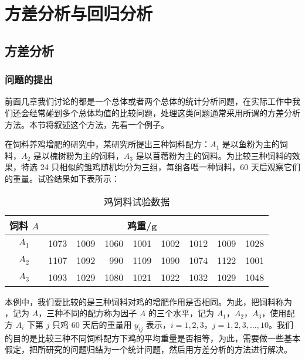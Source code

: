 \chapter{方差分析与回归分析}

\section{方差分析}
\subsection{问题的提出}
前面几章我们讨论的都是一个总体或者两个总体的统计分析问题，在实际工作中我们还会经常碰到多个总体均值的比较问题，处理这类问题通常采用所谓的方差分析方法。本节将叙述这个方法，先看一个例子。

\begin{example}
在饲料养鸡增肥的研究中，某研究所提出三种饲料配方：$A_1$ 是以鱼粉为主的饲料，$A_2$ 是以槐树粉为主的饲料，$A_3$ 是以苜蓿粉为主的饲料。为比较三种饲料的效果，特选 24 只相似的雏鸡随机均分为三组，每组各喂一种饲料，60 天后观察它们的重量。试验结果如下表所示：

\begin{table}[htbp]
  \centering
  \caption{鸡饲料试验数据}
    \begin{tabular}{c|rrrrrrrr}
    \toprule
    饲料 $A$   & \multicolumn{7}{c}{鸡重/\si{\gram}                     } &      \\
    \midrule
    $A_1$  & 1073  & 1009  & 1060  & 1001  & 1002  & 1012  & 1009  & 1028 \\
    $A_2$  & 1107  & 1092  & 990   & 1109  & 1090  & 1074  & 1122  & 1001 \\
    $A_3$  & 1093  & 1029  & 1080  & 1021  & 1022  & 1032  & 1029  & 1048 \\
    \bottomrule
    \end{tabular}%
  \label{tab:8.1.1}%
\end{table}%
\end{example}

本例中，我们要比较的是三种饲料对鸡的增肥作用是否相同。为此，把饲料称为 ，记为 $A$，三种不同的配方称为因子 $A$ 的三个水平，记为 $A_1$，$A_2$，$A_3$，使用配方 $A_i$ 下第 $j$ 只鸡 60 天后的重量用 $y_{ij}$ 表示，$i = 1,2,3$，$j =1,2,3,\ldots,10$。我们的目的是比较三种不同饲料配方下鸡的平均重量是否相等，为此，需要做一些基本假定，把所研究的问题归结为一个统计问题，然后用方差分析的方法进行解决。

